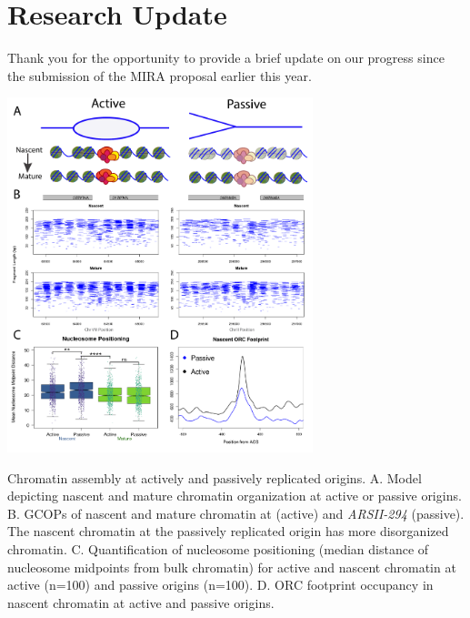 \section*{Research Update}
Thank you for the opportunity to provide a brief update on our progress since the submission of the MIRA proposal earlier this year.  
\begin{floatingfigure}[lt]{3.5in}
\vspace{-8mm}
\begin{center}
\includegraphics[width=3.5in]{r35_figures/dave_origin_cartoon_COMPLETE_figure_10_1_17_2.pdf}
\end{center}
\vspace{3mm}
\caption{Chromatin assembly at actively and passively replicated origins.  A. Model depicting nascent and mature chromatin organization at active or passive  origins.  B. GCOPs of nascent and mature chromatin at  (active) and \textit{ARSII-294} (passive).  The nascent chromatin at the passively replicated origin has more disorganized chromatin.  C.  Quantification of nucleosome positioning (median distance of nucleosome midpoints from bulk chromatin) for active and nascent chromatin at active (n=100) and passive origins (n=100).  D.  ORC footprint occupancy in nascent chromatin at active and passive origins.}%
\end{floatingfigure}%

